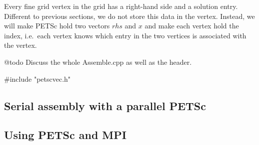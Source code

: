 Every fine grid vertex in the grid has a right-hand side and a solution entry. 
Different to previous sections, we do not store this data in the vertex.
Instead, we will make PETSc hold two vectors $rhs$ and $x$ and
make each vertex hold the index, i.e.~each vertex knows which entry in the two
vertices is associated with the vertex.



@todo Discuss the whole Assemble.cpp as well as the header.

#include "petscvec.h"



\subsection{Serial assembly with a parallel PETSc}


\subsection{Using PETSc and MPI}

